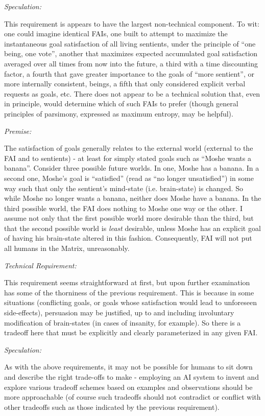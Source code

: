 \documentclass[twoside,11pt]{article}
\begin{document}
\emph{Speculation:}

This requirement is appears to have the largest non-technical component. To
wit: one could imagine identical FAIs, one built to attempt to maximize the
instantaneous goal satisfaction of all living sentients, under the principle of
``one being, one vote'', another that maximizes expected accumulated goal
satisfaction averaged over all times from now into the future, a third with a
time discounting factor, a fourth that gave greater importance to the goals of
``more sentient'', or more internally consistent, beings, a fifth that only
considered explicit verbal requests as goals, etc. There does not appear to be
a technical solution that, even in principle, would determine which of such
FAIs to prefer (though general principles of parsimony, expressed as maximum
entropy, may be helpful).

\emph{Premise:}

The satisfaction of goals generally relates to the external world (external to
the FAI and to sentients) - at least for simply stated goals such as ``Moshe
wants a banana''. Consider three possible future worlds. In one, Moshe has a
banana. In a second one, Moshe's goal is ``satisfied'' (read as ``no longer
unsatisfied'') in some way such that only the sentient's mind-state
(i.e. brain-state) is changed. So while Moshe no longer wants a banana, neither
does Moshe have a banana. In the third possible world, the FAI does nothing to
Moshe one way or the other. I assume not only that the first possible world
more desirable than the third, but that the second possible world is
\emph{least} desirable, unless Moshe has an explicit goal of having his
brain-state altered in this fashion. Consequently, FAI will not put all humans
in the Matrix, unreasonably.

\emph{Technical Requirement:}

This requirement seems straightforward at first, but upon further examination
has some of the thorniness of the previous requirement. This is because in some
situations (conflicting goals, or goals whose satisfaction would lead to
unforeseen side-effects), persuasion may be justified, up to and including
involuntary modification of brain-states (in cases of insanity, for
example). So there is a tradeoff here that must be explicitly and clearly
parameterized in any given FAI.

\emph{Speculation:}

As with the above requirements, it may not be possible for humans to sit down
and describe the right trade-offs to make - employing an AI system to invent
and explore various tradeoff schemes based on examples and observations should
be more approachable (of course such tradeoffs should not contradict or
conflict with other tradeoffs such as those indicated by the previous
requirement).
\end{document}

